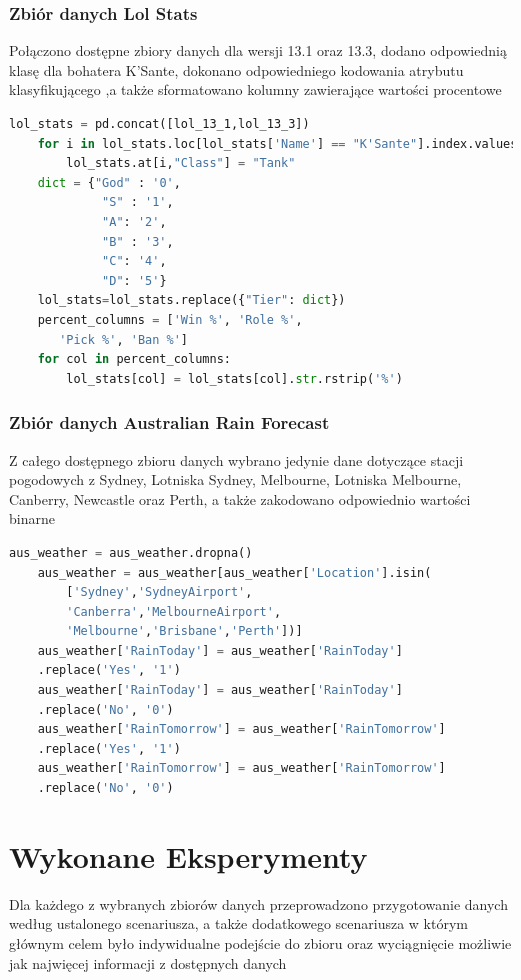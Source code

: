 \documentclass{book}
\begin{document}
\subsection{Zbiór danych Lol Stats}
Połączono dostępne zbiory danych dla wersji 13.1 oraz 13.3, 
dodano odpowiednią klasę dla bohatera K'Sante, dokonano 
odpowiedniego kodowania atrybutu klasyfikującego 
,a także sformatowano kolumny zawierające wartości procentowe
\begin{lstlisting}[language=Python, caption={Przygotowanie zbioru danych Lol Stats do eksperymentów}, captionpos=b]
    lol_stats = pd.concat([lol_13_1,lol_13_3])
    for i in lol_stats.loc[lol_stats['Name'] == "K'Sante"].index.values:
        lol_stats.at[i,"Class"] = "Tank"
    dict = {"God" : '0',
             "S" : '1',
             "A": '2',
             "B" : '3',
             "C": '4',
             "D": '5'}
    lol_stats=lol_stats.replace({"Tier": dict})
    percent_columns = ['Win %', 'Role %',
       'Pick %', 'Ban %']
    for col in percent_columns:
        lol_stats[col] = lol_stats[col].str.rstrip('%')
\end{lstlisting}

\subsection{Zbiór danych Australian Rain Forecast}
Z całego dostępnego zbioru danych wybrano jedynie dane dotyczące stacji pogodowych z Sydney, Lotniska Sydney, Melbourne, 
Lotniska Melbourne, Canberry, Newcastle oraz Perth, a także zakodowano odpowiednio wartości binarne

\begin{lstlisting}[language=Python, caption={Przygotowanie zbioru danych Australian Rain Forecast do eksperymentów}, captionpos=b]
    aus_weather = aus_weather.dropna()
    aus_weather = aus_weather[aus_weather['Location'].isin(
        ['Sydney','SydneyAirport',
        'Canberra','MelbourneAirport',
        'Melbourne','Brisbane','Perth'])]
    aus_weather['RainToday'] = aus_weather['RainToday']
    .replace('Yes', '1')
    aus_weather['RainToday'] = aus_weather['RainToday']
    .replace('No', '0')
    aus_weather['RainTomorrow'] = aus_weather['RainTomorrow']
    .replace('Yes', '1')
    aus_weather['RainTomorrow'] = aus_weather['RainTomorrow']
    .replace('No', '0')
\end{lstlisting}

\chapter{Wykonane Eksperymenty}
Dla każdego z wybranych zbiorów danych przeprowadzono 
przygotowanie danych według ustalonego scenariusza, 
a także dodatkowego scenariusza w którym głównym celem było 
indywidualne podejście do zbioru oraz wyciągnięcie możliwie 
jak najwięcej informacji z dostępnych danych
\end{document}
